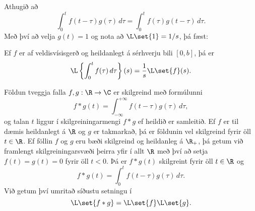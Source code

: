 Athugið að 
 $$\int_0^t f(t-\tau)g(\tau) \, d\tau=
\int_0^t f(\tau)g(t-\tau) \, d\tau.
 $$
Með því að velja $g(t)=1$ og nota að $\L\set{1}=1/s$, þá fæst:

\begin{fs} Ef $f$ er  af veldisvísisgerð og heildanlegt á sérhverju
bili $[0,b]$, þá er
 \begin{equation*}\L\left\{\int_0^t f(\tau) \, d\tau\right\}(s) = \dfrac 1s
\L\set{f}(s).
\label{7.4.6}
 \end{equation*}
\end{fs}

Földun tveggja falla $f, g: \R\to \C$  er skilgreind
með formúlunni 
 $$f*g(t)=\int_{-\infty}^{+\infty}f(t-\tau)g(\tau) \, d\tau,
 $$
og talan $t$ liggur í skilgreiningarmengi $f*g$ ef heildið er
samleitið.  Ef $f$ er til dæmis heildanlegt  á $\R$ og $g$ er
takmarkað, þá er földunin vel skilgreind fyrir öll $t\in \R$.
Ef föllin $f$ og $g$ eru bæði skilgreind og heildanleg á  $\R_+$, þá
getum við framlengt  skilgreiningarsvæði þeirra yfir í allt $\R$ með
því að setja 
$f(t)=g(t)=0$ fyrir öll $t<0$.  Þá er $f*g(t)$  skilgreint fyrir öll
$t\in \R$ og $$ f*g(t)= \int_0^tf(t-\tau)g(\tau)\, d\tau.$$
Við getum því umritað síðustu  setningu í 
\begin{equation*}
\L\set{f*g}=\L\set{f}\L\set{g}.\label{7.4.7}
\end{equation*}


